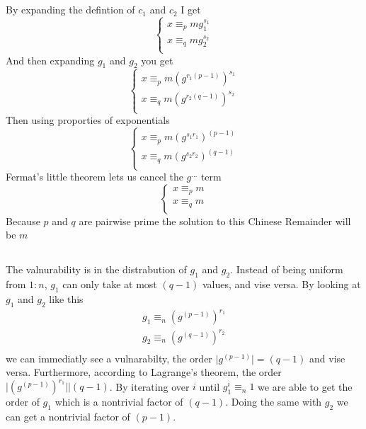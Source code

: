 \documentclass{article}
\begin{document}
\newpage
\section{}
\subsection{}
By expanding the defintion of $c_{1}$ and $c_{2}$ I get
\[
\begin{cases}
x \equiv_{p} mg_{1}^{s_{1}} \\
x \equiv_{q} mg_{2}^{s_{2}} \\
\end{cases}
\]
And then expanding $g_{1}$ and $g_{2}$ you get
\[
\begin{cases}
x \equiv_{p} m(g^{r_{1}(p-1)})^{s_{1}} \\
x \equiv_{q} m(g^{r_{2}(q-1)})^{s_{2}} \\
\end{cases}
\]
Then using proporties of exponentials
\[
\begin{cases}
x \equiv_{p} m(g^{s_{1}r_{1}})^{(p-1)} \\
x \equiv_{q} m(g^{s_{2}r_{2}})^{(q-1)} \\
\end{cases}
\]
Fermat's little theorem lets us cancel the $g^{...}$ term
\[
\begin{cases}
x \equiv_{p} m \\
x \equiv_{q} m \\
\end{cases}
\]
Because $p$ and $q$ are pairwise prime the solution to this Chinese Remainder will be $m$
\subsection{}
The valnurability is in the distrabution of $g_{1}$ and $g_{2}$. Instead of being uniform from $1:n$, $g_{1}$ can only take at most $(q-1)$ values, and vise versa.
By looking at $g_{1}$ and $g_{2}$ like this
\[
\begin{split}
g_{1} \equiv_{n} (g^{(p-1)})^{r_{1}} \\
g_{2} \equiv_{n} (g^{(q-1)})^{r_{2}} \\
\end{split}
\]
we can immediatly see a vulnarabilty, the order $\big|g^{(p-1)}\big| = (q-1)$ and vise versa.
Furthermore, according to Lagrange's theorem, the order $\big|(g^{(p-1)})^{r_{1}}\big|\Big| (q-1)$.
By iterating over $i$ until $g_{1}^{i} \equiv_{n} 1$ we are able to get the order of $g_{1}$ which is a nontrivial
factor of $(q - 1)$. Doing the same with $g_{2}$ we can get a nontrivial factor of $(p - 1)$.
\end{document}
